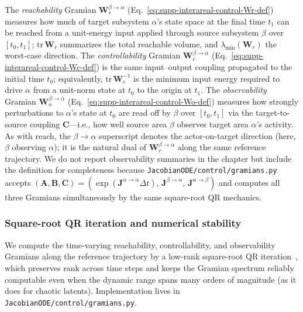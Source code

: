 The \emph{reachability} Gramian $\mathbf{W}_{r}^{\beta\to\alpha}$ (Eq.~\ref{eq:supp-interareal-control-Wr-def}) measures how much of target subsystem $\alpha$'s state space at the final time $t_{1}$ can be reached from a unit-energy input applied through source subsystem $\beta$ over $[t_{0},t_{1}]$; $\mathrm{tr}\,\mathbf{W}_{r}$ summarizes the total reachable volume, and $\lambda_{\min}(\mathbf{W}_{r})$ the worst-case direction. The \emph{controllability} Gramian $\mathbf{W}_{c}^{\beta\to\alpha}$ (Eq.~\ref{eq:supp-interareal-control-Wc-def}) is the same input--output coupling propagated to the initial time $t_{0}$; equivalently, $\mathrm{tr}\,\mathbf{W}_{c}^{-1}$ is the minimum input energy required to drive $\alpha$ from a unit-norm state at $t_{0}$ to the origin at $t_{1}$. The \emph{observability} Gramian $\mathbf{W}_{o}^{\beta\to\alpha}$ (Eq.~\ref{eq:supp-interareal-control-Wo-def}) measures how strongly perturbations to $\alpha$'s state at $t_{0}$ are read off by $\beta$ over $[t_{0},t_{1}]$ via the target-to-source coupling $\mathbf{C}$---i.e., how well source area $\beta$ observes target area $\alpha$'s activity. As with reach, the $\beta\to\alpha$ superscript denotes the actor-on-target direction (here, $\beta$ observing $\alpha$); it is the natural dual of $\mathbf{W}_{r}^{\beta\to\alpha}$ along the same reference trajectory. We do not report observability summaries in the chapter but include the definition for completeness because \texttt{JacobianODE/control/gramians.py} accepts $(\mathbf{A},\mathbf{B},\mathbf{C})=(\exp(\mathbf{J}^{\alpha\to\alpha}\Delta t),\,\mathbf{J}^{\beta\to\alpha},\,\mathbf{J}^{\alpha\to\beta})$ and computes all three Gramians simultaneously by the same square-root QR mechanics.

\subsubsection{Square-root QR iteration and numerical stability}\label{supp:interareal-control-gramian-qr}

We compute the time-varying reachability, controllability, and observability Gramians along the reference trajectory by a low-rank square-root QR iteration~\cite{Antsaklis2006-wl}, which preserves rank across time steps and keeps the Gramian spectrum reliably computable even when the dynamic range spans many orders of magnitude (as it does for chaotic latents). Implementation lives in \texttt{JacobianODE/control/gramians.py}.


